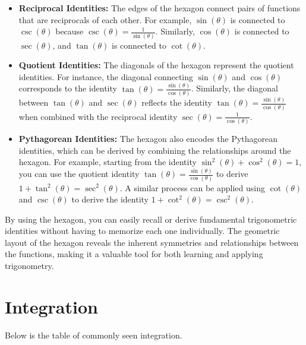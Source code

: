 \begin{itemize}
    \item \textbf{Reciprocal Identities:} The edges of the hexagon connect pairs of functions that are reciprocals of each other. For example, \(\sin(\theta)\) is connected to \(\csc(\theta)\) because \(\csc(\theta) = \frac{1}{\sin(\theta)}\). Similarly, \(\cos(\theta)\) is connected to \(\sec(\theta)\), and \(\tan(\theta)\) is connected to \(\cot(\theta)\).
    
    \item \textbf{Quotient Identities:} The diagonals of the hexagon represent the quotient identities. For instance, the diagonal connecting \(\sin(\theta)\) and \(\cos(\theta)\) corresponds to the identity \(\tan(\theta) = \frac{\sin(\theta)}{\cos(\theta)}\). Similarly, the diagonal between \(\tan(\theta)\) and \(\sec(\theta)\) reflects the identity \(\tan(\theta) = \frac{\sin(\theta)}{\cos(\theta)}\) when combined with the reciprocal identity \(\sec(\theta) = \frac{1}{\cos(\theta)}\).
    
    \item \textbf{Pythagorean Identities:} The hexagon also encodes the Pythagorean identities, which can be derived by combining the relationships around the hexagon. For example, starting from the identity \(\sin^2(\theta) + \cos^2(\theta) = 1\), you can use the quotient identity \(\tan(\theta) = \frac{\sin(\theta)}{\cos(\theta)}\) to derive \(1 + \tan^2(\theta) = \sec^2(\theta)\). A similar process can be applied using \(\cot(\theta)\) and \(\csc(\theta)\) to derive the identity \(1 + \cot^2(\theta) = \csc^2(\theta)\).
\end{itemize}

By using the hexagon, you can easily recall or derive fundamental trigonometric identities without having to memorize each one individually. The geometric layout of the hexagon reveals the inherent symmetries and relationships between the functions, making it a valuable tool for both learning and applying trigonometry.


\section{Integration}
Below is the table of commonly seen integration.

